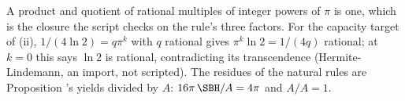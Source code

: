 A product and quotient of rational multiples of integer powers of $\pi$ is one, which is the closure the script checks on the rule's three factors. For the capacity target of (ii), $1/(4\ln 2) = q\pi^k$ with $q$ rational gives $\pi^k\ln 2 = 1/(4q)$ rational; at $k = 0$ this says $\ln 2$ is rational, contradicting its transcendence (Hermite-Lindemann, an import, not scripted). The residues of the natural rules are Proposition 's yields divided by $A$: $16\pi\,\SBH/A = 4\pi$ and $A/A = 1$.
